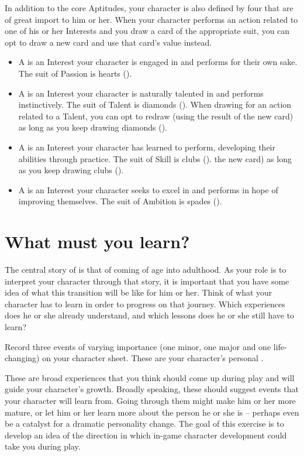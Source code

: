 In addition to the core Aptitudes, your character is also defined by four  that are of
great import to him or her. When your character performs an action related to one of his or her Interests and
you draw a card of the appropriate suit, you can opt to draw a new card and use that card's value instead.
\begin{itemize}
\item A  is an Interest your character is engaged in and performs for their own sake.
	The suit of Passion is hearts (\heart).

\item A  is an Interest your character is naturally talented in and performs instinctively.
	The suit of Talent is diamonds (\diamond).
When drawing for an action related to a Talent, you can opt to redraw (using the result of the new card)
as long as you keep drawing diamonds (\diamond).

\item A  is an Interest your character has learned to perform, developing their abilities
through practice.
	The suit of Skill is clubs (\club).
the new card) as long as you keep drawing clubs (\club).

\item A  is an Interest your character seeks to excel in and performs in hope of improving
themselves.
	The suit of Ambition is spades (\spade).
\end{itemize}

\section{What must you learn?}

The central story of \ParadoxSpaceRPG{} is that of coming of age into adulthood. As your role is to interpret
your character through that story, it is important that you have some idea of what this transition will be like
for him or her.  Think of what your character has to learn in order to progress on that journey. Which
experiences does he or she already understand, and which lessons does he or she still have to learn?

Record three events of varying importance (one minor, one major and one life-changing) on your character sheet.
These are your character's personal .

These are broad experiences that you think should come up during play and will guide your character's growth.
Broadly speaking, these should suggest events that your character will learn from. Going through them might
make him or her more mature, or let him or her learn more about the person he or she is -- perhaps even be
a catalyst for a dramatic personality change. The goal of this exercise is to develop an idea of the direction
in which in-game character development could take you during play.

